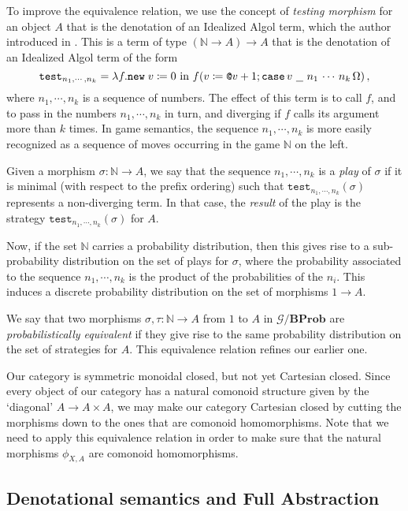 \documentclass{svproc}
\makeatletter
\newcommand\G{\mathcal{G}}
\newcommand{\test}{\texttt{test}}
\newcommand*\from{\colon}
\newcommand{\0}{{\mathtt{0}}} \newcommand{\com}{{\mathtt{com}}}
\newcommand{\deref}{\texttt{@}}
\newcommand{\new}{{\mathtt{new}}}
\renewcommand{\case}{{\mathtt{case}}}
\newcommand{\blank}{\,\underline{\hspace{1.5ex}}\,}
\newcommand{\catname}[1]{\mathbf{#1}}
\newcommand{\BProb}{\catname{BProb}}
\newcommand{\bN}{\mathbb{N}}
\makeatother
\begin{document}
To improve the equivalence relation, we use the concept of \emph{testing morphism} for an object $A$ that is the denotation of an Idealized Algol term, which the author introduced in \cite{CslPaper}.
This is a term of type $(\bN \to A) \to A$ that is the denotation of an Idealized Algol term of the form
\[
  \test_{n_1,\cdots,n_k} = \lambda f.\new\;v\coloneqq 0 \text{ in } f(v \coloneqq \deref v + 1; \case\,v\,\blank\,n_1\,\cdots\,n_k\,\Omega)\,,
  \]
where $n_1,\cdots,n_k$ is a sequence of numbers.  
The effect of this term is to call $f$, and to pass in the numbers $n_1,\cdots,n_k$ in turn, and diverging if $f$ calls its argument more than $k$ times.
In game semantics, the sequence $n_1,\cdots,n_k$ is more easily recognized as a sequence of moves occurring in the game $\bN$ on the left.  

Given a morphism $\sigma\from \bN \to A$, we say that the sequence $n_1,\cdots,n_k$ is a \emph{play} of $\sigma$ if it is minimal (with respect to the prefix ordering) such that $\test_{n_1,\cdots,n_k}(\sigma)$ represents a non-diverging term.
In that case, the \emph{result} of the play is the strategy $\test_{n_1,\cdots,n_k}(\sigma)$ for $A$.

Now, if the set $\bN$ carries a probability distribution, then this gives rise to a sub-probability distribution on the set of plays for $\sigma$, where the probability associated to the sequence $n_1,\cdots,n_k$ is the product of the probabilities of the $n_i$.  
This induces a discrete probability distribution on the set of morphisms $1\to A$.

We say that two morphisms $\sigma,\tau\from \bN\to A$ from $1$ to $A$ in $\G/\BProb$ are \emph{probabilistically equivalent} if they give rise to the same probability distribution on the set of strategies for $A$.  
This equivalence relation refines our earlier one.

Our category is symmetric monoidal closed, but not yet Cartesian closed.  
Since every object of our category has a natural comonoid structure given by the `diagonal' $A\to A\times A$, we may make our category Cartesian closed by cutting the morphisms down to the ones that are comonoid homomorphisms.  
Note that we need to apply this equivalence relation in order to make sure that the natural morphisms $\phi_{X,A}$ are comonoid homomorphisms.

\subsection{Denotational semantics and Full Abstraction}
\end{document}

